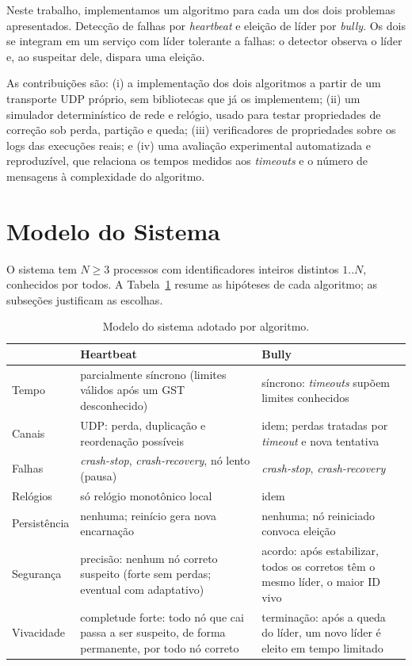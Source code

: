 \documentclass[conference]{IEEEtran}
\begin{document}
Neste trabalho, implementamos um algoritmo para cada um dos dois problemas apresentados. Detecção de falhas por \textit{heartbeat} e eleição de líder por \textit{bully}. Os dois se integram em um serviço com líder tolerante a falhas: o detector observa o líder e, ao suspeitar dele, dispara uma eleição.

As contribuições são: (i) a implementação dos dois algoritmos a partir de um transporte UDP próprio, sem bibliotecas que já os implementem; (ii) um simulador determinístico de rede e relógio, usado para testar propriedades de correção sob perda, partição e queda; (iii) verificadores de propriedades sobre os logs das execuções reais; e (iv) uma avaliação experimental automatizada e reproduzível, que relaciona os tempos medidos aos \textit{timeouts} e o número de mensagens à complexidade do algoritmo.

\section{Modelo do Sistema}
\label{sec:modelo}

O sistema tem $N \ge 3$ processos com identificadores inteiros distintos $1..N$, conhecidos por todos. A Tabela~\ref{tab:modelo} resume as hipóteses de cada algoritmo; as subseções justificam as escolhas.

\begin{table}[t]
\centering
\caption{Modelo do sistema adotado por algoritmo.}
\label{tab:modelo}
\footnotesize
\begin{tabular}{>{\raggedright\arraybackslash}p{}
                >{\raggedright\arraybackslash}p{}
                >{\raggedright\arraybackslash}p{}}
\toprule
 & \textbf{Heartbeat} & \textbf{Bully} \\
\midrule
Tempo & parcialmente síncrono (limites válidos após um GST desconhecido) & síncrono: \textit{timeouts} supõem limites conhecidos \\
Canais & UDP: perda, duplicação e reordenação possíveis & idem; perdas tratadas por \textit{timeout} e nova tentativa \\
Falhas & \textit{crash-stop}, \textit{crash-recovery}, nó lento (pausa) & \textit{crash-stop}, \textit{crash-recovery} \\
Relógios & só relógio monotônico local & idem \\
Persistência & nenhuma; reinício gera nova encarnação & nenhuma; nó reiniciado convoca eleição \\
Segurança & precisão: nenhum nó correto suspeito (forte sem perdas; eventual com adaptativo) & acordo: após estabilizar, todos os corretos têm o mesmo líder, o maior ID vivo \\
Vivacidade & completude forte: todo nó que cai passa a ser suspeito, de forma permanente, por todo nó correto & terminação: após a queda do líder, um novo líder é eleito em tempo limitado \\
\bottomrule
\end{tabular}
\end{table}
\end{document}

